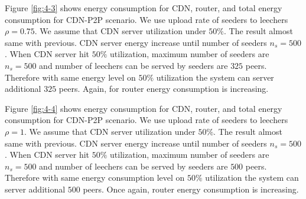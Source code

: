 \documentclass[JIP]{ipsj}
\begin{document}
Figure \ref{fig:4-3} shows energy consumption for CDN, router, and total energy consumption for CDN-P2P scenario.  
We use upload rate of seeders to leechers $\rho=0.75$.
We assume that CDN server utilization under $50\%$.
The result almost same with previous. 
CDN server energy increase until number of seeders $n_s=500$.
When CDN server hit $50\%$ utilization, maximum number of seeders are $n_s=500$ and number of leechers can be served by seeders are $325$ peers. 
Therefore with same energy level on $50\%$ utilization the system can server additional $325$ peers. 
Again, for router energy consumption is increasing. 

Figure \ref{fig:4-4} shows energy consumption for CDN, router, and total energy consumption for CDN-P2P scenario.  
We use upload rate of seeders to leechers $\rho=1$.
We assume that CDN server utilization under $50\%$.
The result almost same with previous. 
CDN server energy increase until number of seeders $n_s=500$.
When CDN server hit $50\%$ utilization, maximum number of seeders are $n_s=500$ and number of leechers can be served by seeders are $500$ peers. 
Therefore with same energy consumption level on $50\%$ utilization the system can server additional $500$ peers. 
Once again, router energy consumption is increasing. 
\end{document}
